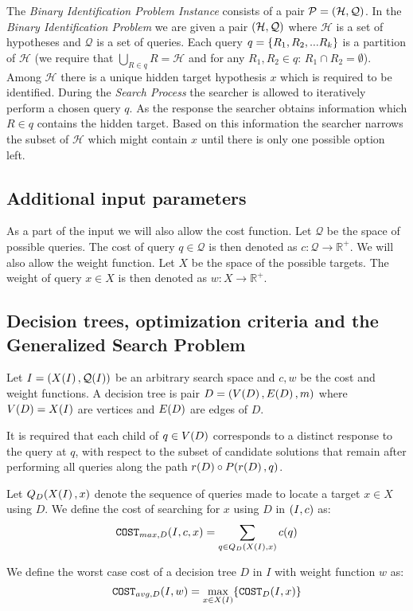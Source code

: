The \textit{Binary Identification Problem Instance} consists of a pair $\mathcal{P}=\mathopen{}\left( \mathcal{H}, \mathcal{Q} \right)$. In the \textit{Binary Identification Problem} we are given a pair $\mathopen{}\left( \mathcal{H}, \mathcal{Q} \right)$ where $\mathcal{H}$ is a set of hypotheses and $\mathcal{Q}$ is a set of queries. Each query $q = \mathopen{}\left\{ R_1, R_2,...R_k \right\}$ is a partition of $\mathcal{H}$ (we require that $\bigcup_{R\in q}R=\mathcal{H}$ and for any $R_1,R_2\in q$: $R_1\cap R_2=\emptyset$). Among $\mathcal{H}$ there is a unique hidden target hypothesis $x$ which is required
to be identified. During the \textit{Search Process} the searcher is allowed to iteratively perform a chosen query $q$. As the response the searcher obtains information which $R\in q$ contains the hidden target. Based on this information the searcher narrows the subset of $\mathcal{H}$ which might contain $x$ until there is only one possible option left.
\subsection{Additional input parameters}
As a part of the input we will also allow the cost function. Let $\mathcal{Q}$ be the space of possible queries. The cost of query $q\in\mathcal{Q}$ is then denoted
as $c:\mathcal{Q}\to \mathbb{R}^+$. We will also allow the weight function. Let $X$ be the space of the possible targets. The weight of query $x\in X$ is then denoted
as $w:X\to \mathbb{R}^+$. 
\subsection{Decision trees, optimization criteria and the Generalized Search Problem}
Let $I=\mathopen{}\left( X\mathopen{}\left( I \right), \mathcal{Q}\mathopen{}\left( I \right) \right)$ be an arbitrary search space and $c,w$ be the cost and weight functions. A decision tree is pair $D=(V\mathopen{}\left( D \right), E\mathopen{}\left( D \right), m)$ where $V\mathopen{}\left( D \right)=X\mathopen{}\left( I \right)$ are vertices and $E\mathopen{}\left( D \right)$ are edges of $D$. 

It is required that each child of $q\in V\mathopen{}\left( 
D \right)$ corresponds to a distinct response to the query at $q$, with respect to the subset of candidate solutions that remain after performing all queries along the path $r\mathopen{}\left( D \right)\circ P\mathopen{}\left( r\mathopen{}\left( D \right), q \right)$. 

Let $Q_D\mathopen{}\left( X\mathopen{}\left( I \right),x \right)$ denote the sequence of queries made to locate a target $x \in X$ using $D$. We define the cost of searching for $x$ using $D$ in $\mathopen{}\left( I,c \right)$ as:
$$
\texttt{COST}_{max,D}\mathopen{}\left( I, c, x \right) = \sum_{q\in Q_{D}\mathopen{}\left( X\mathopen{}\left( I \right),x \right)}c\mathopen{}\left( q \right)
$$

We define the worst case cost of a decision tree $D$ in $I$ with weight function $w$ as:
$$
\texttt{COST}_{avg, D}\mathopen{}\left( I, w \right) = \max_{x\in X\mathopen{}\left( I \right)} \mathopen{}\left\{ \texttt{COST}_D\mathopen{}\left( I, x \right) \right\}
$$


